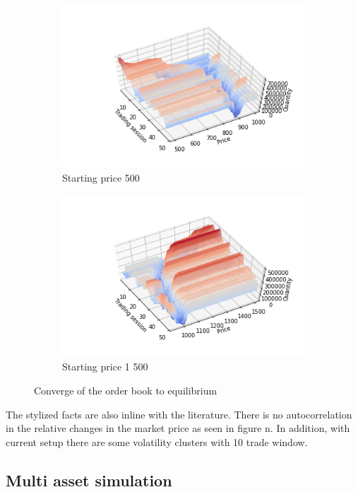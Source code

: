 \begin{figure}
    \centering
    \begin{subfigure}{.5\textwidth}
      \centering
      \includegraphics[width=\linewidth]{plots/basic_market_depth_converge_lower.png}
      \caption{Starting price 500}
      \label{fig:market_depth_lower}
    \end{subfigure}%
    \begin{subfigure}{.5\textwidth}
      \centering
      \includegraphics[width=\linewidth]{plots/basic_market_depth_converge_higher.png}
      \caption{Starting price 1 500}
      \label{fig:market_depth_higher}
    \end{subfigure}
    \caption{Converge of the order book to equilibrium}
    \label{fig:market_depths}
\end{figure}


The stylized facts are also inline with the literature. There is no autocorrelation
in the relative changes in the market price as seen in figure n. In addition, with
current setup there are some volatility clusters with 10 trade window.


\subsection{Multi asset simulation}

